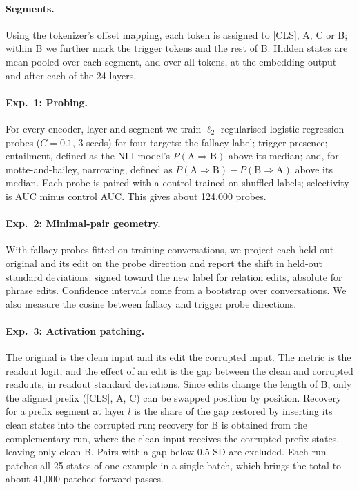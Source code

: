 \documentclass[11pt]{article}
\begin{document}
\paragraph{Segments.} Using the tokenizer's offset mapping, each token is assigned to [CLS], A, C or B; within B we further mark the trigger tokens and the rest of B. Hidden states are mean-pooled over each segment, and over all tokens, at the embedding output and after each of the 24 layers.

\paragraph{Exp.~1: Probing.} For every encoder, layer and segment we train $\ell_2$-regularised logistic regression probes ($C=0.1$, 3 seeds) for four targets: the fallacy label; trigger presence; entailment, defined as the NLI model's $P(\text{A} \Rightarrow \text{B})$ above its median; and, for motte-and-bailey, narrowing, defined as $P(\text{A} \Rightarrow \text{B}) - P(\text{B} \Rightarrow \text{A})$ above its median. Each probe is paired with a control trained on shuffled labels; selectivity is AUC minus control AUC. This gives about 124,000 probes.

\paragraph{Exp.~2: Minimal-pair geometry.} With fallacy probes fitted on training conversations, we project each held-out original and its edit on the probe direction and report the shift in held-out standard deviations: signed toward the new label for relation edits, absolute for phrase edits. Confidence intervals come from a bootstrap over conversations. We also measure the cosine between fallacy and trigger probe directions.

\paragraph{Exp.~3: Activation patching.} The original is the clean input and its edit the corrupted input. The metric is the readout logit, and the effect of an edit is the gap between the clean and corrupted readouts, in readout standard deviations. Since edits change the length of B, only the aligned prefix ([CLS], A, C) can be swapped position by position. Recovery for a prefix segment at layer $l$ is the share of the gap restored by inserting its clean states into the corrupted run; recovery for B is obtained from the complementary run, where the clean input receives the corrupted prefix states, leaving only clean B. Pairs with a gap below 0.5 SD are excluded. Each run patches all 25 states of one example in a single batch, which brings the total to about 41,000 patched forward passes.
\end{document}

